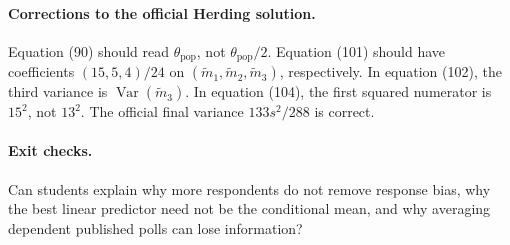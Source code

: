 \documentclass[11pt]{article}
\newcommand{\rv}[1]{\widetilde{#1}}
\newcommand{\Var}{\operatorname{Var}}
\begin{document}
\paragraph{Corrections to the official Herding solution.}
Equation (90) should read $\theta_{\mathrm{pop}}$, not
$\theta_{\mathrm{pop}}/2$. Equation (101) should have coefficients
$(15,5,4)/24$ on $(\rv m_1,\rv m_2,\rv m_3)$, respectively.
In equation (102), the third variance is $\Var(\rv m_3)$.
In equation (104), the first squared numerator is $15^2$, not $13^2$.
The official final variance $133s^2/288$ is correct.

\paragraph{Exit checks.}
Can students explain why more respondents do not remove response bias,
why the best linear predictor need not be the conditional mean, and why
averaging dependent published polls can lose information?
\fi
\end{document}
